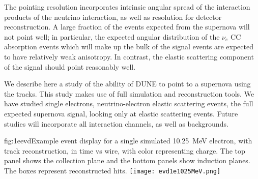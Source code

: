 The pointing resolution incorporates intrinsic angular spread of the interaction products of the neutrino interaction, as well as resolution for detector reconstruction.  A large fraction of the events expected from the supernova will not point well; in particular, the expected angular distribution of the $\nu_e$ CC absorption events which will make up the bulk of the signal events are expected to have relatively weak anisotropy.  In contrast, the elastic scattering component of the signal should point reasonably well.

We describe here a study of the ability of DUNE to point to a
supernova using the  tracks.  This study makes use of full 
simulation and reconstruction tools.
We have studied single electrons, neutrino-electron elastic scattering
events, the full expected supernova signal, looking only at elastic
scattering events.  Future studies will incorporate all interaction
channels, as well as backgrounds.


\begin{dunefigure}{fig:1eevd}{Example event display for a
    single simulated 10.25~MeV electron, with track reconstruction, in
    time vs wire, with color representing charge.
    The top panel shows the collection plane and the bottom panels
    show induction planes.  The boxes represent reconstructed hits. }
 \texttt{[image: evd1e1025MeV.png]}
\end{dunefigure}




